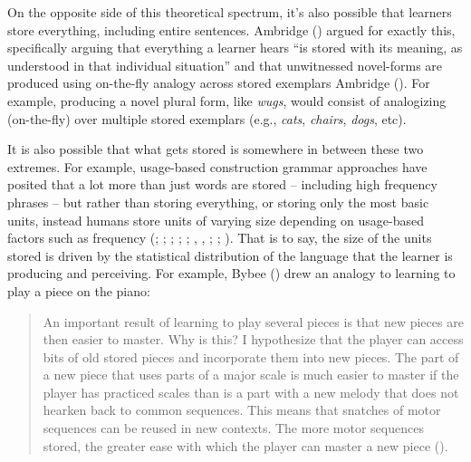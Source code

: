 \documentclass[
  12pt,
  letterpaper,
]{scrreprt}
\begin{document}
On the opposite side of this theoretical spectrum, it's also possible
that learners store everything, including entire sentences. Ambridge
() argued for
exactly this, specifically arguing that everything a learner hears ``is
stored with its meaning, as understood in that individual situation''
and that unwitnessed novel-forms are produced using on-the-fly analogy
across stored exemplars Ambridge
(). For
example, producing a novel plural form, like \emph{wugs}, would consist
of analogizing (on-the-fly) over multiple stored exemplars (e.g.,
\emph{cats}, \emph{chairs}, \emph{dogs}, etc).

It is also possible that what gets stored is somewhere in between these
two extremes. For example, usage-based construction grammar approaches
have posited that a lot more than just words are stored -- including
high frequency phrases -- but rather than storing everything, or storing
only the most basic units, instead humans store units of varying size
depending on usage-based factors such as frequency
(;
; ;
;
;
,
,
;
;
). That is to say, the size of the units stored is driven by the
statistical distribution of the language that the learner is producing
and perceiving. For example, Bybee () drew
an analogy to learning to play a piece on the piano:

\begin{quote}
An important result of learning to play several pieces is that new
pieces are then easier to master. Why is this? I hypothesize that the
player can access bits of old stored pieces and incorporate them into
new pieces. The part of a new piece that uses parts of a major scale is
much easier to master if the player has practiced scales than is a part
with a new melody that does not hearken back to common sequences. This
means that snatches of motor sequences can be reused in new contexts.
The more motor sequences stored, the greater ease with which the player
can master a new piece ().
\end{quote}
\end{document}
